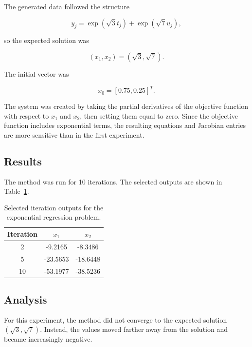\documentclass[11pt]{article}
\begin{document}
The generated data followed the structure

\begin{equation}
    y_j = \exp(\sqrt{3}t_j) + \exp(\sqrt{7}u_j),
\end{equation}

so the expected solution was

\begin{equation}
    (x_1,x_2) = (\sqrt{3}, \sqrt{7}).
\end{equation}

The initial vector was

\begin{equation}
    x_0 = [0.75, 0.25]^T.
\end{equation}

The system was created by taking the partial derivatives of the objective function with respect to $x_1$ and $x_2$, then setting them equal to zero. Since the objective function includes exponential terms, the resulting equations and Jacobian entries are more sensitive than in the first experiment.

\subsection{Results}

The method was run for 10 iterations. The selected outputs are shown in Table~\ref{tab:task2-results}.

\begin{table}[h!]
\centering
\begin{tabular}{ccc}
\toprule
\textbf{Iteration} & \textbf{$x_1$} & \textbf{$x_2$} \\
\midrule
2 & -9.2165 & -8.3486 \\
5 & -23.5653 & -18.6448 \\
10 & -53.1977 & -38.5236 \\
\bottomrule
\end{tabular}
\caption{Selected iteration outputs for the exponential regression problem.}
\label{tab:task2-results}
\end{table}

\subsection{Analysis}

For this experiment, the method did not converge to the expected solution $(\sqrt{3}, \sqrt{7})$. Instead, the values moved farther away from the solution and became increasingly negative.
\end{document}
